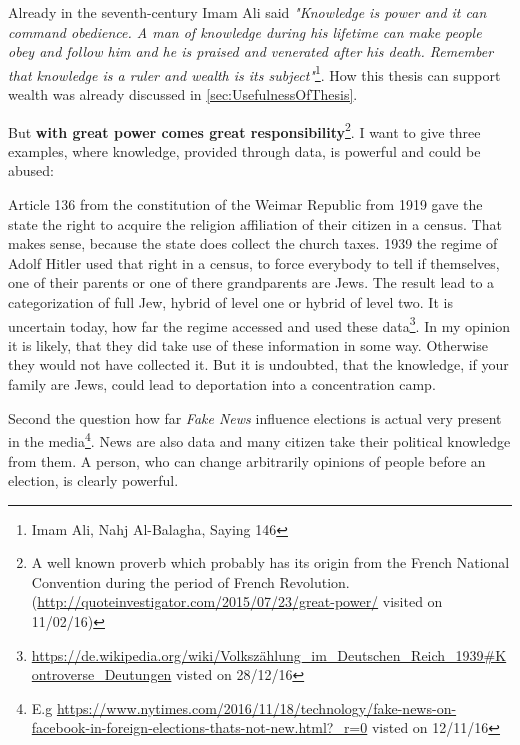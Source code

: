 \documentclass[12pt, twoside]{report}
\begin{document}
Already in the seventh-century Imam Ali said \textit{"Knowledge is power and it can command obedience. A man of knowledge during his lifetime can make people obey and follow him and he is praised and venerated after his death. Remember that knowledge is a ruler and wealth is its subject"}\footnote{Imam Ali, Nahj Al-Balagha, Saying 146}. How this thesis can support wealth was already discussed in \cref{sec:UsefulnessOfThesis}.

But \textbf{with great power comes great responsibility}\footnote{A well known proverb which probably has its origin from the French National Convention during the period of French Revolution. (\url{http://quoteinvestigator.com/2015/07/23/great-power/} visited on 11/02/16)}. I want to give three examples, where knowledge, provided through data, is powerful and could be abused:

Article 136 from the constitution of the Weimar Republic from 1919 gave the state the right to acquire the religion affiliation of their citizen in a census. That makes sense, because the state does collect the church taxes. 1939 the regime of Adolf Hitler used that right in a census, to force everybody to tell if themselves, one of their parents or one of there grandparents are Jews. The result lead to a categorization of full Jew, hybrid of level one or hybrid of level two. It is uncertain today, how far the regime accessed and used these data\footnote{\url{https://de.wikipedia.org/wiki/Volkszählung_im_Deutschen_Reich_1939#Kontroverse_Deutungen} visted on 28/12/16}. In my opinion it is likely, that they did take use of these information in some way. Otherwise they would not have collected it. But it is undoubted, that the knowledge, if your family are Jews, could lead to deportation into a concentration camp.

Second the question how far \textit{Fake News} influence elections is actual very present in the media\footnote{E.g \url{https://www.nytimes.com/2016/11/18/technology/fake-news-on-facebook-in-foreign-elections-thats-not-new.html?_r=0} visted on 12/11/16}. News are also data and many citizen take their political knowledge from them. A person, who can change arbitrarily opinions of people before an election, is clearly powerful.   
\end{document}
